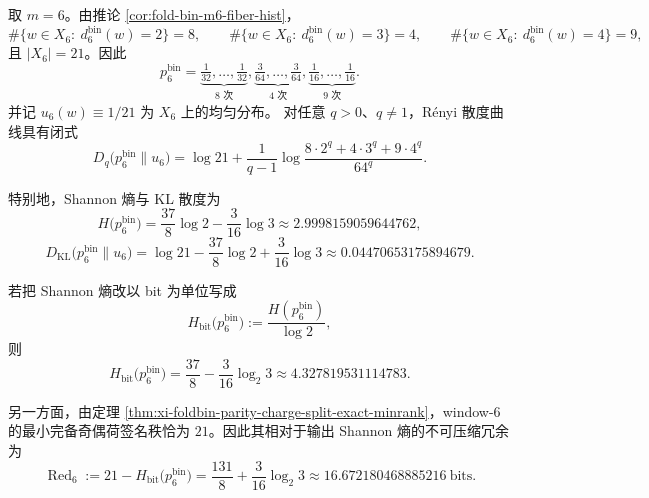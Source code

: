 \begin{proposition}\label{prop:xi-window6-renyi-divergence-parity-charge-redundancy}
取 \(m=6\)。由推论 \ref{cor:fold-bin-m6-fiber-hist}，
\[
\#\{w\in X_6:\ d_6^{\mathrm{bin}}(w)=2\}=8,\qquad
\#\{w\in X_6:\ d_6^{\mathrm{bin}}(w)=3\}=4,\qquad
\#\{w\in X_6:\ d_6^{\mathrm{bin}}(w)=4\}=9,
\]
且 \(|X_6|=21\)。因此
\[
p_6^{\mathrm{bin}}
=
\underbrace{\tfrac{1}{32},\dots,\tfrac{1}{32}}_{8\text{ 次}},
\underbrace{\tfrac{3}{64},\dots,\tfrac{3}{64}}_{4\text{ 次}},
\underbrace{\tfrac{1}{16},\dots,\tfrac{1}{16}}_{9\text{ 次}}.
\]
并记 \(u_6(w)\equiv 1/21\) 为 \(X_6\) 上的均匀分布。
对任意 \(q>0\)、\(q\neq 1\)，Rényi 散度曲线具有闭式
\[
\boxed{\;
D_q\!\bigl(p_6^{\mathrm{bin}}\|u_6\bigr)
=
\log 21+\frac{1}{q-1}
\log\frac{8\cdot 2^q+4\cdot 3^q+9\cdot 4^q}{64^q}.\;}
\]

特别地，Shannon 熵与 KL 散度为
\[
\boxed{\;
H\!\bigl(p_6^{\mathrm{bin}}\bigr)
=
\frac{37}{8}\log 2-\frac{3}{16}\log 3
\approx 2.9998159059644762,\;}
\]
\[
\boxed{\;
D_{\mathrm{KL}}\!\bigl(p_6^{\mathrm{bin}}\|u_6\bigr)
=
\log 21-\frac{37}{8}\log 2+\frac{3}{16}\log 3
\approx 0.04470653175894679.\;}
\]

若把 Shannon 熵改以 bit 为单位写成
\[
H_{\mathrm{bit}}\!\bigl(p_6^{\mathrm{bin}}\bigr)
:=
\frac{H(p_6^{\mathrm{bin}})}{\log 2},
\]
则
\[
\boxed{\;
H_{\mathrm{bit}}\!\bigl(p_6^{\mathrm{bin}}\bigr)
=
\frac{37}{8}-\frac{3}{16}\log_2 3
\approx 4.327819531114783.\;}
\]

另一方面，由定理 \ref{thm:xi-foldbin-parity-charge-split-exact-minrank}，window-\(6\) 的最小完备奇偶荷签名秩恰为 \(21\)。因此其相对于输出 Shannon 熵的不可压缩冗余为
\[
\boxed{\;
\operatorname{Red}_6
:=
21-H_{\mathrm{bit}}\!\bigl(p_6^{\mathrm{bin}}\bigr)
=
\frac{131}{8}+\frac{3}{16}\log_2 3
\approx 16.672180468885216\ \mathrm{bits}.\;}
\]
\end{proposition}
